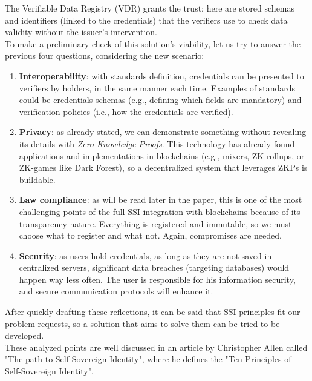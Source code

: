 The Verifiable Data Registry (VDR) grants the trust: here are stored schemas and 
identifiers (linked to the credentials) that the verifiers use to check 
data validity without the issuer's intervention.
\vspace*{0.3cm}\\
To make a preliminary check of this solution's viability, let us try to 
answer the previous four questions, considering the new scenario:
\begin{enumerate}
    \item \textbf{Interoperability}: with standards definition, credentials
    can be presented to verifiers by holders, in the same manner each time. 
    Examples of standards could be credentials schemas (e.g., defining which fields are 
    mandatory) and verification policies (i.e., how the credentials are verified).
    \item \textbf{Privacy}: as already stated, we can demonstrate something
    without revealing its details with \textit{Zero-Knowledge Proofs}. This 
    technology has already found applications and implementations in 
    blockchains (e.g., mixers\cite{site:mixers}, ZK-rollups\cite{site:zkrollups}, 
    or ZK-games like Dark Forest\cite{site:darkforest}), 
    so a decentralized system that leverages ZKPs is buildable.
    \item \textbf{Law compliance}: as will be read later in the paper, 
    this is one of the most challenging points of the full SSI integration 
    with blockchains because of its transparency nature. Everything is 
    registered and immutable, so we must choose what to register and what 
    not. Again, compromises are needed.
    \item \textbf{Security}: as users hold credentials, as long as they are
    not saved in centralized servers, significant data breaches (targeting 
    databases) would happen way less often. The user is responsible for his 
    information security, and secure communication protocols will enhance it.
\end{enumerate}
After quickly drafting these reflections, it can be said that SSI 
principles fit our problem requests, so a solution that aims to solve them 
can be tried to be developed.\\
These analyzed points are well discussed in an article by Christopher Allen 
called "The path to Self-Sovereign Identity", where he defines the "Ten 
Principles of Self-Sovereign Identity"\cite{site:ssiprinciples}.

